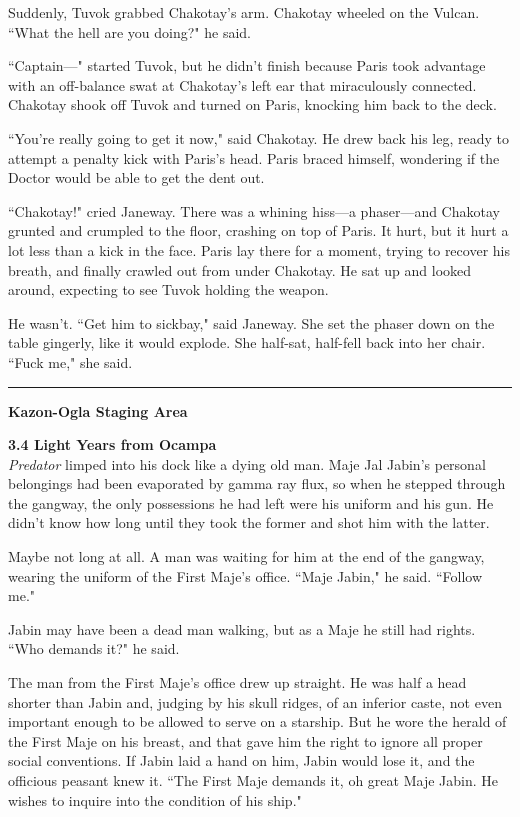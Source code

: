 \documentclass[twoside,letterpaper,12pt]{memoir}
\begin{document}
Suddenly, Tuvok grabbed Chakotay's arm. Chakotay wheeled on the Vulcan. ``What the hell are you doing?" he said.

``Captain---" started Tuvok, but he didn't finish because Paris took advantage with an off-balance swat at Chakotay's left ear that miraculously connected. Chakotay shook off Tuvok and turned on Paris, knocking him back to the deck.

``You're really going to get it now," said Chakotay. He drew back his leg, ready to attempt a penalty kick with Paris's head. Paris braced himself, wondering if the Doctor would be able to get the dent out.

``Chakotay!" cried Janeway. There was a whining hiss---a phaser---and Chakotay grunted and crumpled to the floor, crashing on top of Paris. It hurt, but it hurt a lot less than a kick in the face. Paris lay there for a moment, trying to recover his breath, and finally crawled out from under Chakotay. He sat up and looked around, expecting to see Tuvok holding the weapon.

He wasn't. ``Get him to sickbay," said Janeway. She set the phaser down on the table gingerly, like it would explode. She half-sat, half-fell back into her chair. ``Fuck me," she said.

\begin{center}\rule{3cm}{0.4 pt}\end{center}

\noindent\textbf{Kazon-Ogla Staging Area}

\noindent\textbf{3.4 Light Years from Ocampa}\\

\textit{Predator} limped into his dock like a dying old man. Maje Jal Jabin's personal belongings had been evaporated by gamma ray flux, so when he stepped through the gangway, the only possessions he had left were his uniform and his gun. He didn't know how long until they took the former and shot him with the latter.

Maybe not long at all. A man was waiting for him at the end of the gangway, wearing the uniform of the First Maje's office. ``Maje Jabin," he said. ``Follow me."

Jabin may have been a dead man walking, but as a Maje he still had rights. ``Who demands it?" he said.

The man from the First Maje's office drew up straight. He was half a head shorter than Jabin and, judging by his skull ridges, of an inferior caste, not even important enough to be allowed to serve on a starship. But he wore the herald of the First Maje on his breast, and that gave him the right to ignore all proper social conventions. If Jabin laid a hand on him, Jabin would lose it, and the officious peasant knew it. ``The First Maje demands it, oh great Maje Jabin. He wishes to inquire into the condition of his ship."
\end{document}
